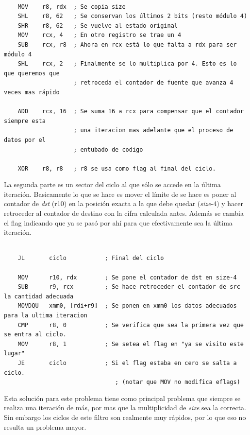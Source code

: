 \begin{verbatim}

	MOV    r8, rdx  ; Se copia size
	SHL    r8, 62   ; Se conservan los últimos 2 bits (resto módulo 4)		
	SHR    r8, 62   ; Se vuelve al estado original
	MOV    rcx, 4   ; En otro registro se trae un 4
	SUB    rcx, r8  ; Ahora en rcx está lo que falta a rdx para ser módulo 4
	SHL    rcx, 2   ; Finalmente se lo multiplica por 4. Esto es lo que queremos que
                    ; retroceda el contador de fuente que avanza 4 veces mas rápido
									
	ADD    rcx, 16  ; Se suma 16 a rcx para compensar que el contador siempre esta
                    ; una iteracion mas adelante que el proceso de datos por el
                    ; entubado de codigo

	XOR	   r8, r8 	; r8 se usa como flag al final del ciclo.						

\end{verbatim}


	La segunda parte es un sector del ciclo al que sólo se accede en la última
iteración. Basicamente lo que se hace es mover el límite de se hace es
poner al contador de \textit{dst} (r10) en la posición exacta a la que debe
quedar (\textit{size}-4) y hacer retroceder al contador de destino
con la cifra calculada antes. Además se cambia el flag indicando que ya
se pasó por ahí para que efectivamente sea la última iteración.



\begin{verbatim}

	JL       ciclo           ; Final del ciclo

	MOV      r10, rdx        ; Se pone el contador de dst en size-4
	SUB      r9, rcx         ; Se hace retroceder el contador de src la cantidad adecuada
	MOVDQU   xmm0, [rdi+r9]  ; Se ponen en xmm0 los datos adecuados para la ultima iteracion
	CMP      r8, 0           ; Se verifica que sea la primera vez que se entra al ciclo.
	MOV      r8, 1           ; Se setea el flag en "ya se visito este lugar"
	JE       ciclo           ; Si el flag estaba en cero se salta a ciclo. 
                                ; (notar que MOV no modifica eflags)

\end{verbatim}


	Esta solución para este problema tiene como principal problema
que siempre se realiza una iteración de más, por mas que la multiplicidad
de \textit{size} sea la correcta. Sin embargo los ciclos
de este filtro son realmente muy rápidos, por lo que eso no resulta
un problema mayor.

